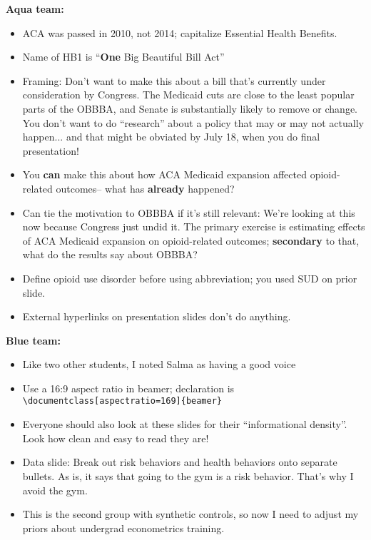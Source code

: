 \documentclass[12pt,pdftex,letterpaper]{article}
\begin{document}
\noindent \textbf{Aqua team:}
\begin{itemize}
	\item ACA was passed in 2010, not 2014; capitalize Essential Health Benefits.
	
	\item Name of HB1 is ``\textbf{One} Big Beautiful Bill Act''
	
	\item Framing: Don't want to make this about a bill that's currently under consideration by Congress. The Medicaid cuts are close to the least popular parts of the OBBBA, and Senate is substantially likely to remove or change. You don't want to do ``research'' about a policy that may or may not actually happen... and that might be obviated by July 18, when you do final presentation!
	
	\item You \textbf{can} make this about how ACA Medicaid expansion affected opioid-related outcomes-- what has \textbf{already} happened?
	
	\item Can tie the motivation to OBBBA if it's still relevant: We're looking at this now because Congress just undid it. The primary exercise is estimating effects of ACA Medicaid expansion on opioid-related outcomes; \textbf{secondary} to that, what do the results say about OBBBA?
	
	\item Define opioid use disorder before using abbreviation; you used SUD on prior slide.
	
	\item External hyperlinks on presentation slides don't do anything.
\end{itemize}

\vspace{0.5cm}

\noindent \textbf{Blue team:}
\begin{itemize}
	\item Like two other students, I noted Salma as having a good voice
	
	\item Use a 16:9 aspect ratio in beamer; declaration is \texttt{\textbackslash documentclass[aspectratio=169]\{beamer\}}
	
	\item Everyone should also look at these slides for their ``informational density''. Look how clean and easy to read they are!
	
	\item Data slide: Break out risk behaviors and health behaviors onto separate bullets. As is, it says that going to the gym is a risk behavior. That's why I avoid the gym.
	
	\item This is the second group with synthetic controls, so now I need to adjust my priors about undergrad econometrics training.
\end{itemize}
\end{document}
